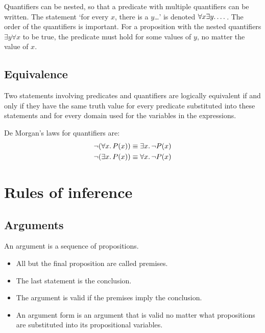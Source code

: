 Quantifiers can be nested, so that a predicate with multiple quantifiers can be written. The statement `for every \(x\), there is a \(y\)\dots' is denoted \(\forall x \exists y\ldotp \dots\). The order of the quantifiers is important. For a proposition with the nested quantifiers \(\exists y \forall x\) to be true, the predicate must hold for some values of \(y\), no matter the value of \(x\).

\subsection{Equivalence}
Two statements involving predicates and quantifiers are logically equivalent if and only if they have the same truth value for every predicate substituted into these statements and for every domain used for the variables in the expressions.

De Morgan's laws for quantifiers are:
\begin{align*}
    \neg(\forall x\ldotp P(x)) & \equiv \exists x\ldotp \neg P(x) \\
    \neg(\exists x\ldotp P(x)) & \equiv \forall x\ldotp \neg P(x)
\end{align*}

\section{Rules of inference}
\subsection{Arguments}
An argument is a sequence of propositions.
\begin{itemize}
    \item All but the final proposition are called premises.
    \item The last statement is the conclusion.
    \item The argument is valid if the premises imply the conclusion.
    \item An argument form is an argument that is valid no matter what propositions are substituted into its propositional variables.
\end{itemize}

